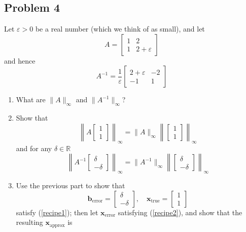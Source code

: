 \documentclass{article}
\newcommand{\R}{{\mathbb R}}
\newcommand{\ep}{{\varepsilon}}
\begin{document}
\subsection*{Problem 4}
Let $\ep > 0$ be a real number (which we think of as small), and let
\begin{equation}
	A = \begin{bmatrix} 1 & 2 \\ 1 & 2 + \ep \end{bmatrix}
\end{equation}
and hence
\[
	A^{-1} = \frac{1}{\ep}\begin{bmatrix} 2 + \ep & -2 \\ -1 & 1 \end{bmatrix}
\]
\begin{enumerate}
	\item What are $\lVert A \rVert_\infty$ and $\lVert A^{-1} \rVert_\infty$?
	\item Show that
		\[
			\left\lVert A\begin{bmatrix} 1 \\ 1 \end{bmatrix} \right\rVert_\infty
			= \lVert A \rVert_\infty \left\lVert
			\begin{bmatrix} 1 \\ 1 \end{bmatrix} \right\rVert_\infty
		\]
		and for any $\delta \in \R$
		\[
			\left\lVert A^{-1}\begin{bmatrix} \delta \\ -\delta \end{bmatrix} \right\rVert_\infty
			= \lVert A^{-1} \rVert_\infty \left\lVert
			\begin{bmatrix} \delta \\ -\delta \end{bmatrix} \right\rVert_\infty
		\]
	\item Use the previous part to show that
		\[
			\mathbf{b}_{\text{error}} = \begin{bmatrix} \delta \\ -\delta \end{bmatrix}, \quad
			\mathbf{x}_{\text{true}} = \begin{bmatrix} 1 \\ 1 \end{bmatrix}
		\]
		satisfy (\ref{recipe1});
		then let $\mathbf{x}_{\text{error}}$ satisfying (\ref{recipe2}),
		and show that the resulting $\mathbf{x}_{\text{approx}}$ is
		\begin{equation}\label{xapprox}

\end{equation}
\end{enumerate}
\end{document}
